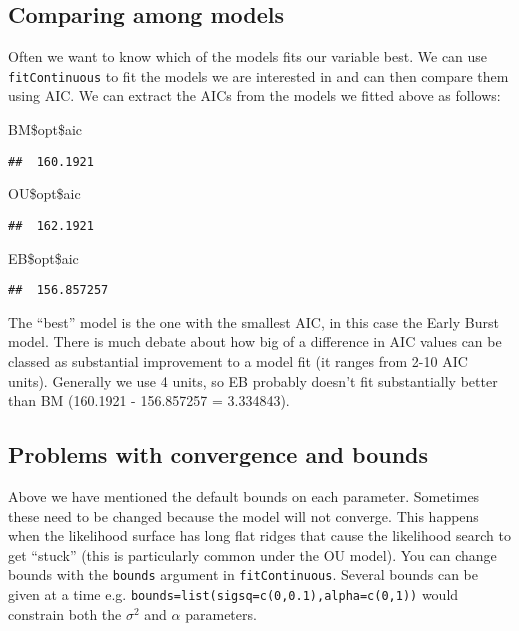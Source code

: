 \documentclass[11pt]{article}
\newcommand{\NormalTok}[1]{{#1}}
\begin{document}
\subsection{Comparing among models}

Often we want to know which of the models fits our variable best. We can use \texttt{fitContinuous} to fit the models we are interested in and can then compare them using AIC. We can extract the AICs from the models we fitted above as follows:

\begin{snugshade}
\begin{Highlighting}[]
\NormalTok{BM\$opt\$aic}
\end{Highlighting}
\end{snugshade}
\begin{verbatim}
##  160.1921
\end{verbatim}
\begin{snugshade}
\begin{Highlighting}[]
\NormalTok{OU\$opt\$aic}
\end{Highlighting}
\end{snugshade}
\begin{verbatim}
##  162.1921
\end{verbatim}
\begin{snugshade}
\begin{Highlighting}[]
\NormalTok{EB\$opt\$aic}
\end{Highlighting}
\end{snugshade}
\begin{verbatim}
##  156.857257
\end{verbatim}

The ``best'' model is the one with the smallest AIC, in this case the Early Burst model. There is much debate about how big of a difference in AIC values can be classed as substantial improvement to a model fit (it ranges from 2-10 AIC units). Generally we use 4 units, so EB probably doesn't fit substantially better than BM (160.1921 - 156.857257 = 3.334843). 

\subsection{Problems with convergence and bounds}

Above we have mentioned the default bounds on each parameter. Sometimes these need to be changed because the model will not converge. This happens when the likelihood surface has long flat ridges that cause the likelihood search to get ``stuck'' (this is particularly common under the OU model). You can change bounds with the \texttt{bounds} argument in \texttt{fitContinuous}. Several bounds can be given at a time e.g. \texttt{bounds=list(sigsq=c(0,0.1),alpha=c(0,1))} would constrain both the $\sigma^2$ and $\alpha$ parameters.
\end{document}
